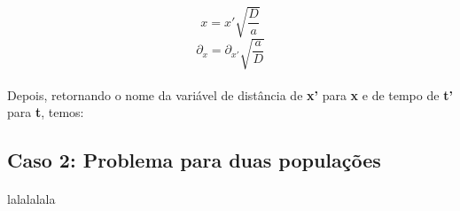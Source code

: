 \documentclass{article}
\begin{document}
	$$ x = x' \sqrt{\frac{D}{a}} $$
	$$ \partial_x = \partial_{x'} \sqrt{\frac{a}{D}} $$
	
	\paragraph{}
	Depois, retornando o nome da variável de distância de \textbf{x'} para \textbf{x} e de tempo de \textbf{t'} para \textbf{t}, temos:
	
	\subsection{Caso 2: Problema para duas populações}
	\paragraph{}
	lalalalala
		
\end{document}
